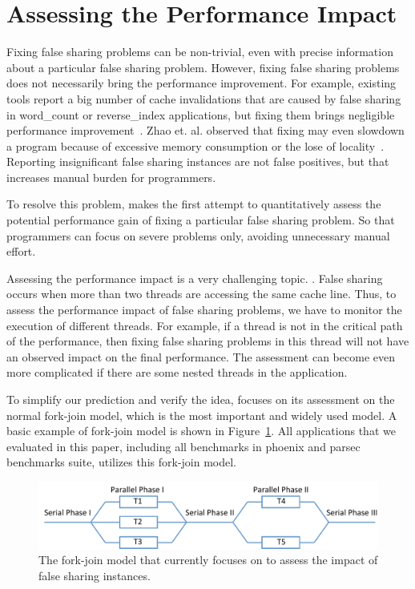 \section{Assessing the Performance Impact}

\label{sec:predictimprove}

Fixing false sharing problems can be non-trivial, even with precise information about a particular false sharing problem. However, fixing false sharing problems does not necessarily bring the performance improvement. For example, existing tools report a big number of cache invalidations that are caused by false sharing in word\_count or reverse\_index applications, but fixing them brings negligible performance improvement~\cite{Sheriff, Predator}. Zhao et. al. observed that fixing may even slowdown a program because of excessive memory consumption or the lose of locality~\cite{qinzhao}. Reporting insignificant false sharing instances are not false positives, but that increases manual burden for programmers.

To resolve this problem, \cheetah{} makes the first attempt to quantitatively assess the potential performance gain of fixing a particular false sharing problem. So that programmers can focus on severe problems only, avoiding unnecessary manual effort.

Assessing the performance impact is a very challenging topic. . False sharing occurs when more than two threads are accessing the same cache line. Thus, to assess the performance impact of false sharing problems, we have to monitor the execution of different threads. For example, if a thread is not in the critical path of the performance, then fixing false sharing problems in this thread will not have an observed impact on the final performance. The assessment can become even more complicated if there are some nested threads in the application.

To simplify our prediction and verify the idea, \cheetah{} focuses on its assessment on the normal fork-join model, which is the most important and widely used model. A basic example of fork-join model is shown in  Figure~\ref{fig:forkjoinmodel}. All applications that we evaluated in this paper, including all benchmarks in phoenix and parsec benchmarks suite, utilizes this fork-join model. 

\begin{figure}[ht!]
\begin{center}
\includegraphics[width=6.5in]{figure/forkjoin}
\end{center}
\caption{The fork-join model that \Cheetah{} currently focuses on to assess the impact of false sharing instances. 
\label{fig:forkjoinmodel}}
\end{figure}

